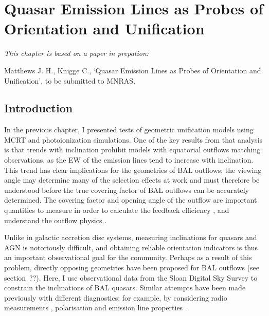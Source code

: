 \chapter{Quasar Emission Lines as Probes of Orientation and Unification}



{\em This chapter is based on a paper in prepation:

Matthews J. H., Knigge C., 
`Quasar Emission Lines as Probes of Orientation and Unification',
to be submitted to MNRAS.}


%
%
\maketitle

\section{Introduction}

In the previous chapter, I presented tests of geometric unification
models using MCRT and photoionization simulations. 
One of the key results from that analysis is that trends with
inclination prohibit models with equatorial outflows matching
observations, as the EW of the emission lines tend
to increase with inclination. This trend has clear implications for
the geometries of BAL outflows; the viewing angle may determine many
of the selection effects at work and must therefore be understood
before the true covering factor of BAL outflows can be accurately 
determined. The covering factor and opening angle of the outflow
are important quantities to measure in order to calculate the
feedback efficiency \citep[e.g.][]{borguet2012}, 
and understand the outflow physics \citep[e.g.][]{proga2005}. 

Unlike in galactic accretion disc systems, measuring inclinations
for quasars and AGN is notoriously difficult, and obtaining 
reliable orientation indicators is thus an important observational
goal for the community. Perhaps as a result of this problem, 
directly opposing geometries have been proposed for 
BAL outflows (see section~??). Here, I use observational 
data from the Sloan Digital Sky Survey to constrain the inclinations
of BAL quasars. Similar attempts have been made previously with
different diagnostics; for example, by considering 
radio measurements \citep{zhou2006,dipompeo2012a}, 
polarisation \citep{brotherton2006}
and emission line properties \citep{dipompeo2012b}.  

